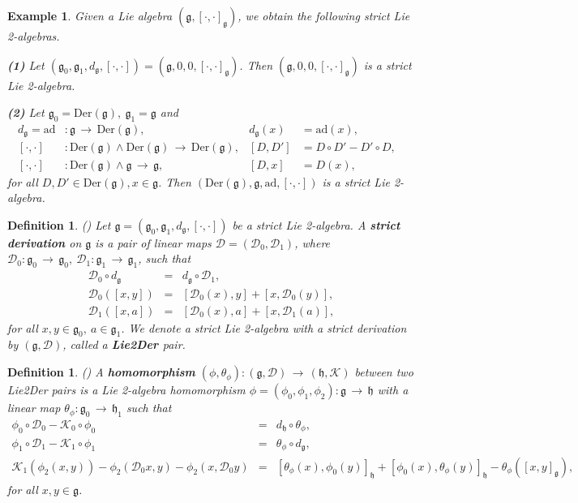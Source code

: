 \documentclass[12pt]{amsart}
\newtheorem{ex}[thm]{Example}
\newtheorem{defi}[thm]{Definition}
\newcommand{\lon }{\,\rightarrow\,}
\newcommand{\g}{\mathfrak g}
\newcommand{\h}{\mathfrak h}
\newcommand{\huaD}{\mathcal{D}}
\newcommand{\huaK}{\mathcal{K}}
\newcommand{\LtoD}{{\rm Lie2Der }}
\newcommand{\Der}{\mathrm{Der}}
\newcommand{\ad}{\mathrm{ad}}
\begin{document}
\begin{ex}\label{impex1}
Given a Lie algebra $(\g,[\cdot,\cdot]_{\g})$, we obtain the following strict Lie 2-algebras.

{\bf (1)} Let $(\g_0, \g_1, d_\g, [\cdot, \cdot])=(\g,0,0,[\cdot,\cdot]_{\g})$. Then $(\g,0,0,[\cdot,\cdot]_{\g})$ is a strict Lie 2-algebra. 

{\bf (2)} Let $\g_{0}=\Der(\g),\  \g_{1}=\g$ and 
\begin{align*}
    d_\g=\ad&:\g\lon \Der (\g),& d_\g(x)&=\ad(x),&\\
    [\cdot,\cdot]&:\Der(\g)\wedge \Der(\g) \lon \Der (\g),&[D,D']&=D\circ D'-D'\circ D,&\\
    [\cdot,\cdot]&:\Der(\g)\wedge \g \lon \g,&[D,x]&=D(x),&
\end{align*}
for all $D,D'\in \Der(\g),  x\in \g$. Then $(\Der(\g),\g,\ad,[\cdot,\cdot])$ is a strict Lie 2-algebra. 
\end{ex}

\begin{defi}{\rm(\cite{LLS})}
Let $\g=(\g_{0},\g_{1},d_\g,[\cdot,\cdot])$ be a strict Lie 2-algebra. A {\bf strict derivation} on $\g$ is a pair of linear maps $\huaD=(\huaD_{0},\huaD_{1})$, where $\huaD_{0}:\g_{0}\lon \g_{0},\  \huaD_{1}:\g_{1}\lon \g_{1}$, such that 
\begin{eqnarray*}\label{eq2der}
\huaD_{0}\circ d_\g&=&d_\g \circ \huaD_{1},\\
\huaD_{0}([x,y])&=&[\huaD_{0}(x),y]+[x,\huaD_{0}(y)],\\
\huaD_{1}([x,a])&=&[\huaD_{0}(x),a]+[x,\huaD_{1}(a)],
\end{eqnarray*}
for all $x,y\in \g_{0},\  a\in \g_{1}$.
We denote a strict Lie 2-algebra with a strict derivation by $(\g,\huaD)$, called a {\bf \LtoD} pair. 
\end{defi}

\begin{defi}{\rm (\cite{LW})}
A {\bf homomorphism} $(\phi,\theta_{\phi}):(\g,\huaD)\lon (\h,\huaK)$ between two \LtoD pairs is a Lie 2-algebra homomorphism $\phi=(\phi_{0},\phi_{1},\phi_{2}):\g\lon\h$ with a linear map $\theta_{\phi}:\g_{0}\lon\h_{1}$ such that 
\begin{eqnarray}
\label{eqLie2Derhom1}
\phi_{0}\circ \huaD_{0}-\huaK_{0}\circ \phi_{0}&=&d_{\h}\circ \theta_{\phi},\\
\label{eqLie2Derhom2}
\phi_{1}\circ \huaD_{1}-\huaK_{1}\circ \phi_{1}&=&\theta_{\phi}\circ d_{\g},\\
\label{eqLie2Derhom3}
\huaK_{1}(\phi_{2}(x,y))-\phi_{2}(\huaD_{0}x,y)-\phi_{2}(x,\huaD_{0}y)
&=&[\theta_{\phi}(x),\phi_{0}(y)]_{\h}+[\phi_{0}(x),\theta_{\phi}(y)]_{\h}-\theta_{\phi}([x,y]_{\g}),
\end{eqnarray}
for all $x,y\in \g$.
\end{defi}
\end{document}
